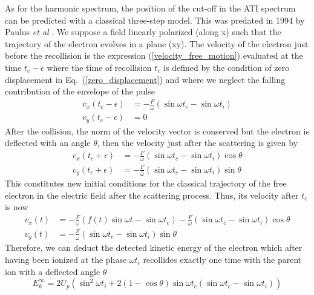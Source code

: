 \documentclass[a4paper]{article}
\begin{document}
As for the harmonic spectrum, the position of the cut-off in the ATI spectrum can be predicted with a classical three-step model. This was predated in 1994 by Paulus \textit{et al} \cite{Paulus_1994_Classical_Model}. We suppose a field linearly polarized (along x) such that the trajectory of the electron evolves in a plane (xy). The velocity of the electron just before the recollision is the expression (\ref{velocity_free_motion}) evaluated at the time $t_{c}-\epsilon$ where the time of recollision $t_{c}$ is defined by the condition of zero displacement in Eq.~(\ref{zero_displacement}) and where we neglect the falling contribution of the envelope of the pulse
\begin{align}
v_{x}(t_{c}-\epsilon)&=-\frac{F}{\omega} \left( \sin{\omega t_{c}} - \sin{\omega t_{i}} \right) \\
v_{y}(t_{c}-\epsilon)&=0
\end{align}
After the collision, the norm of the velocity vector is conserved but the electron is deflected with an angle $\theta$, then the velocity just after the scattering is given by
\begin{align}
v_{x}(t_{c}+\epsilon)&=-\frac{F}{\omega} \left( \sin{\omega t_{c}} - \sin{\omega t_{i}} \right) \cos{\theta} \\
v_{y}(t_{c}+\epsilon)&=-\frac{F}{\omega} \left( \sin{\omega t_{c}} - \sin{\omega t_{i}} \right) \sin{\theta}
\end{align}
This constitutes new initial conditions for the classical trajectory of the free electron in the electric field after the scattering process. Thus, its velocity after $t_{c}$ is now
\begin{align}
\label{vx_theta}
v_{x}(t)&=-\frac{F}{\omega} \left(f(t)\sin{\omega t}-\sin{\omega t_{c}} \right) - \frac{F}{\omega} \left( \sin{\omega t_{c}}-\sin{\omega t_{i}} \right) \cos{\theta} \\
\label{vy_theta}
v_{y}(t)&=-\frac{F}{\omega} \left( \sin{\omega t_{c}} - \sin{\omega t_{i}} \right) \sin{\theta}
\end{align}
Therefore, we can deduct the detected kinetic energy of the electron which after having been ionized at the phase $\omega t_{i}$ recollides exactly one time with the parent ion with a deflected angle $\theta$
\begin{equation}
E_{k}^{\infty}=2 U_{p} \left(\sin^{2}{\omega t_{i}}+2(1-\cos{\theta})\sin{\omega t_{c}} \left(\sin{\omega t_{c}}-\sin{\omega t_{i}}\right)\right)
\label{kinetic_energy_theta}
\end{equation}
\end{document}
